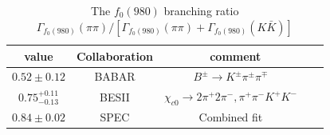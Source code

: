 {\begin{table}[htbp]
    \caption{The $f_{0}(980)$ branching ratio $\Gamma_{f_{0}(980)}(\pi\pi) / \left[ \Gamma_{f_{0}(980)}(\pi\pi)+\Gamma_{f_{0}(980)}(K\bar{K})\right]$}
    \label{f0-KK-pipi}
    \begin{center}
        \begin{tabular}{cccc}
            \toprule
            value &         Collaboration & comment\\
            \hline
            $0.52\pm0.12$ &             BABAR    & $B^{\pm} \rightarrow K^{\pm}\pi^{\pm}\pi^{\mp}$  ~\cite{pipi-KK-1} \\
            $0.75_{-0.13}^{+0.11}$ &    BESII    & $\chi_{c0} \rightarrow 2\pi^{+}2\pi^{-}, \pi^{+}\pi^{-}K^{+}K^{-}$  ~\cite{pipi-KK-2} \\
            $0.84\pm0.02$ &             SPEC    & Combined fit  ~\cite{pipi-KK-3} \\
            \bottomrule
        \end{tabular}
    \end{center}
\end{table}





}

